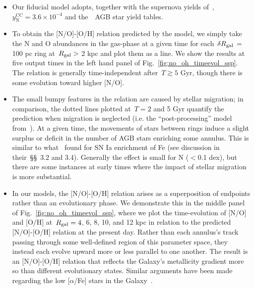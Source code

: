 \documentclass[ms.tex]{subfiles}
\begin{document}
\begin{itemize} 
	\item Our fiducial model adopts, together with the supernova yields 
	of~\citet[][see discussion in~\S~\ref{sec:methods:yields}]{Johnson2021}, 
	$y_\text{N}^\text{CC} = 3.6\times10^{-4}$ and the~\cristallo~AGB star yield 
	tables. 

	\item To obtain the [N/O]-[O/H] relation predicted by the model, we simply 
	take the N and O abundances in the gas-phase at a given time for 
	each~$\delta R_\text{gal}$ = 100 pc ring at~$R_\text{gal} >$ 2 kpc and plot them as a 
	line.
	We show the results at five output times in the left hand panel of 
	Fig.~\ref{fig:no_oh_timeevol_ssp}. 
	The relation is generally time-independent after~$T \gtrsim 5$ Gyr, though 
	there is some evolution toward higher [N/O]. 

	\item The small bumpy features in the relation are caused by stellar 
	migration; in comparison, the dotted lines plotted at~$T = 2$ and 5 Gyr 
	quantify the prediction when migration is neglected (i.e. the 
	``post-processing'' model from~\citealt{Johnson2021}). 
	At a given time, the movements of stars between rings induce a slight 
	surplus or deficit in the number of AGB stars enriching some annulus. 
	This is similar to what~\citet{Johnson2021} found for SN Ia enrichment of 
	Fe (see discussion in their~\S\S~3.2 and 3.4). 
	Generally the effect is small for N ($<$0.1 dex), but there are some 
	instances at early times where the impact of stellar migration is more 
	substantial. \tabularnewline
	
	\item In our models, the [N/O]-[O/H] relation arises as a superposition of 
	endpoints rather than an evolutionary phase. 
	We demonstrate this in the middle panel of 
	Fig.~\ref{fig:no_oh_timeevol_ssp}, where we plot the time-evolution of 
	[N/O] and [O/H] at~$R_\text{gal} = 4$, 6, 8, 10, and 12 kpc in relation to the 
	predicted [N/O]-[O/H] relation at the present day. 
	Rather than each annulus's track passing through some well-defined region 
	of this parameter space, they instead each evolve upward more or less 
	parallel to one another. 
	The result is an [N/O]-[O/H] relation that reflects the Galaxy's 
	metallicity gradient more so than different evolutionary states. 
	Similar arguments have been made regarding the low [$\alpha$/Fe] stars in 
	the Galaxy~\citep[see, e.g.,][]{Schoenrich2009, Sharma2020}. 


\end{itemize}
\end{document}
